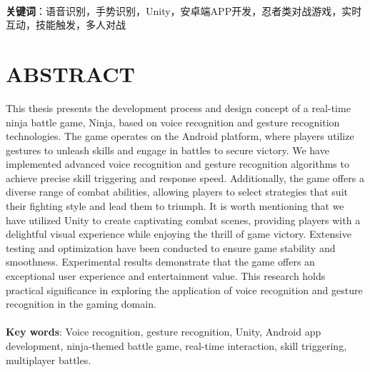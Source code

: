 \documentclass[UTF8,a4paper,12pt]{ctexart}
\numberwithin{equation}{section}
\begin{document}
~\\
\textbf{关键词}：语音识别，手势识别，Unity，安卓端APP开发，忍者类对战游戏，实时互动，技能触发，多人对战\\

\newpage
{}
\section*{ABSTRACT}

This thesis presents the development process and design concept of a real-time ninja battle game, Ninja, based on voice recognition and gesture recognition technologies. The game operates on the Android platform, where players utilize gestures to unleash skills and engage in battles to secure victory. We have implemented advanced voice recognition and gesture recognition algorithms to achieve precise skill triggering and response speed. Additionally, the game offers a diverse range of combat abilities, allowing players to select strategies that suit their fighting style and lead them to triumph. It is worth mentioning that we have utilized Unity to create captivating combat scenes, providing players with a delightful visual experience while enjoying the thrill of game victory. Extensive testing and optimization have been conducted to ensure game stability and smoothness. Experimental results demonstrate that the game offers an exceptional user experience and entertainment value. This research holds practical significance in exploring the application of voice recognition and gesture recognition in the gaming domain.\\
~\\ 
\textbf{Key words}: Voice recognition, gesture recognition, Unity, Android app development, ninja-themed battle game, real-time interaction, skill triggering, multiplayer battles.



\newpage
\renewcommand\contentsname{\textbf{Content}}

\begin{center}
{\tableofcontents
\thispagestyle{fancy}
}
\end{center}
\end{document}
